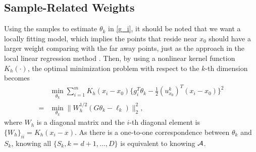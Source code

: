 \documentclass{article}
\theoremstyle{remark}
\begin{document}
\subsection{Sample-Related Weights}
Using the samples to estimate $\theta_k$ in \eqref{g_i}, it should be noted that we want a locally fitting model, which implies 
the points that reside near $x_0$ should have a larger weight comparing with the far away points, just as the approach in the local linear regression method \cite{cheng2013local}. Then, by using a nonlinear kernel function $K_h(\cdot)$, the optimal minimization problem with respect to the $k$-th dimension becomes
\begin{equation*}
\begin{aligned}\label{optimal}
  &\min_{\theta_k} \sum_{i=1}^m K_h(x_i-x_0)\{ g_i^T \theta_k  - \frac{1}{2} {(u^k_{x_0})}^T (x_i -x_0)\}^2\\
= & \min_{\theta_k} \|W_h^{1/2}(G \theta_k-\ell_k) \|_2^2,
\end{aligned}
\end{equation*}
where $W_h$ is a diagonal matrix and the $i$-th diagonal element is $\{{W_h}\}_{ii} = K_h(x_i-x)$.
As there is a one-to-one correspondence between $\theta_k$ and $S_k$, knowing all $\{S_k, k=d+1,...,D\}$ is equivalent to knowing $\cal A$.
\end{document}
